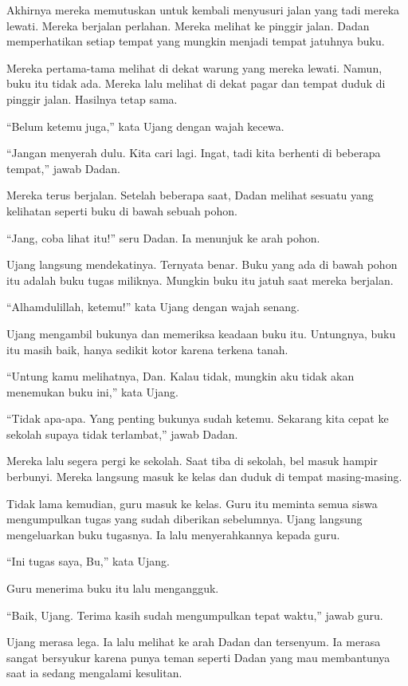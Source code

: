 Akhirnya mereka memutuskan untuk kembali menyusuri jalan yang tadi mereka lewati. Mereka berjalan perlahan. Mereka melihat ke pinggir jalan. Dadan memperhatikan setiap tempat yang mungkin menjadi tempat jatuhnya buku.

Mereka pertama-tama melihat di dekat warung yang mereka lewati. Namun, buku itu tidak ada. Mereka lalu melihat di dekat pagar dan tempat duduk di pinggir jalan. Hasilnya tetap sama.

``Belum ketemu juga,'' kata Ujang dengan wajah kecewa.

``Jangan menyerah dulu. Kita cari lagi. Ingat, tadi kita berhenti di beberapa tempat,'' jawab Dadan.

Mereka terus berjalan. Setelah beberapa saat, Dadan melihat sesuatu yang kelihatan seperti buku di bawah sebuah pohon.

``Jang, coba lihat itu!'' seru Dadan. Ia menunjuk ke arah pohon.

Ujang langsung mendekatinya. Ternyata benar. Buku yang ada di bawah pohon itu adalah buku tugas miliknya. Mungkin buku itu jatuh saat mereka berjalan.

``Alhamdulillah, ketemu!'' kata Ujang dengan wajah senang.

Ujang mengambil bukunya dan memeriksa keadaan buku itu. Untungnya, buku itu masih baik, hanya sedikit kotor karena terkena tanah.

``Untung kamu melihatnya, Dan. Kalau tidak, mungkin aku tidak akan menemukan buku ini,'' kata Ujang.

``Tidak apa-apa. Yang penting bukunya sudah ketemu. Sekarang kita cepat ke sekolah supaya tidak terlambat,'' jawab Dadan.

Mereka lalu segera pergi ke sekolah. Saat tiba di sekolah, bel masuk hampir berbunyi. Mereka langsung masuk ke kelas dan duduk di tempat masing-masing.

Tidak lama kemudian, guru masuk ke kelas. Guru itu meminta semua siswa mengumpulkan tugas yang sudah diberikan sebelumnya. Ujang langsung mengeluarkan buku tugasnya. Ia lalu menyerahkannya kepada guru.

``Ini tugas saya, Bu,'' kata Ujang.

Guru menerima buku itu lalu mengangguk.

``Baik, Ujang. Terima kasih sudah mengumpulkan tepat waktu,'' jawab guru.

Ujang merasa lega. Ia lalu melihat ke arah Dadan dan tersenyum. Ia merasa sangat bersyukur karena punya teman seperti Dadan yang mau membantunya saat ia sedang mengalami kesulitan.

